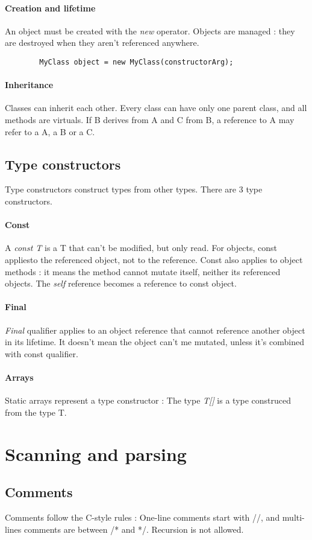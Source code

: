 \documentclass[a4paper, 12pt]{article}
\begin{document}
	\paragraph{Creation and lifetime}
	An object must be created with the \textit{new} operator. Objects are managed : they are destroyed when they aren't referenced anywhere.
	\begin{verbatim}
		MyClass object = new MyClass(constructorArg);
	\end{verbatim}
	\paragraph{Inheritance}
	Classes can inherit each other. Every class can have only one parent class, and all methods are virtuals. If B derives from A and C from B, a reference to A may refer to a A, a B or a C.
	
	\subsection{Type constructors}
	Type constructors construct types from other types. There are 3 type constructors.
	\paragraph{Const}
	A \textit{const T} is a T that can't be modified, but only read. For objects, const appliesto the referenced object, not to the reference.
	Const also applies to object methods : it means the method cannot mutate itself, neither its referenced objects. The \textit{self} reference becomes a reference to const object.
	\paragraph{Final}
	\textit{Final} qualifier applies to an object reference that cannot reference another object in its lifetime. It doesn't mean the object can't me mutated, unless it's combined with const qualifier.
	\paragraph{Arrays}
	Static arrays represent a type constructor : The type \textit{T[]} is a type construced from the type T.
	
	
	\newpage
	\section{Scanning and parsing}
	\subsection{Comments}
	Comments follow the C-style rules : One-line comments start with //, and multi-lines comments are between /* and */. Recursion is not allowed.
\end{document}
